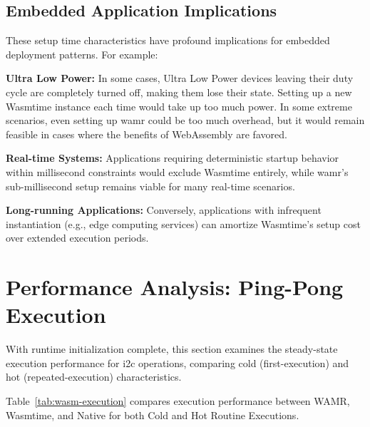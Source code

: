 \subsection{Embedded Application Implications}
\label{subsec:setup-implications}

These setup time characteristics have profound implications for embedded deployment patterns. For example:

\textbf{Ultra Low Power:} In some cases, Ultra Low Power devices leaving their duty cycle are completely turned off, making them lose their state. Setting up a new Wasmtime instance each time would take up too much power. In some extreme scenarios, even setting up \acrshort{wamr} could be too much overhead, but it would remain feasible in cases where the benefits of WebAssembly are favored.

\textbf{Real-time Systems:} Applications requiring deterministic startup behavior within millisecond constraints would exclude Wasmtime entirely, while \acrshort{wamr}'s sub-millisecond setup remains viable for many real-time scenarios.

\textbf{Long-running Applications:} Conversely, applications with infrequent instantiation (e.g., edge computing services) can amortize Wasmtime's setup cost over extended execution periods.

\section{Performance Analysis: Ping-Pong Execution}
\label{sec:eval-execution}

With runtime initialization complete, this section examines the steady-state execution performance for \acrshort{i2c} operations, comparing cold (first-execution) and hot (repeated-execution) characteristics.

Table~\ref{tab:wasm-execution} compares execution performance between WAMR, Wasmtime, and Native for both Cold and Hot Routine Executions.


